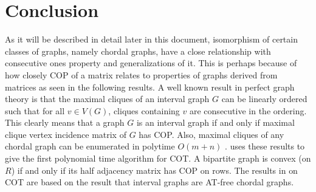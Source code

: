 \documentclass[MS,]{iitmdiss}
\begin{document}
\chapter{Conclusion}
As it will be described in detail later in this document, isomorphism
of certain classes of graphs, namely chordal graphs, have a close
relationship with consecutive ones property and generalizations of it.
This is perhaps because of how closely COP of a matrix relates to
properties of graphs derived from matrices as seen in the following
results. %
A well known result in perfect graph theory is that the maximal
cliques of an interval graph $G$ can be linearly ordered such that for
all $v \in V(G)$, cliques containing $v$ are consecutive in the
ordering\cite{gh64}. This clearly means that a graph $G$ is an
interval graph if and only if  maximal clique vertex incidence matrix of $G$
has COP.  Also, maximal cliques of any chordal graph can be enumerated
in polytime $O(m+n)$ .  \cite{fg65} uses these
results to give the first polynomial time algorithm for
COT.   A bipartite graph
is convex (on $R$) if and only if its half adjacency matrix has COP on
rows.  The results in \cite{bl76}
on COT are based on the result that
interval graphs are AT-free chordal graphs. 






\end{document}
